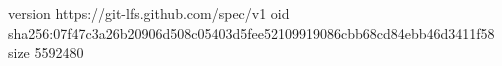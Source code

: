 version https://git-lfs.github.com/spec/v1
oid sha256:07f47c3a26b20906d508c05403d5fee52109919086cbb68cd84ebb46d3411f58
size 5592480
